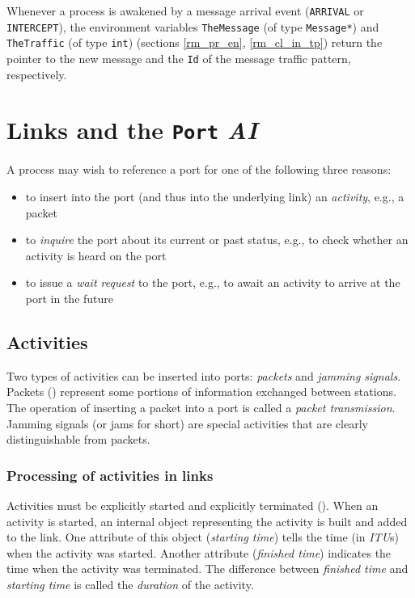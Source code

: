 Whenever a process is
awakened by a message arrival event ({\tt ARRIVAL} or {\tt INTERCEPT}),
the environment variables
{\tt TheMessage} (of type {\tt Message*}) and {\tt TheTraffic}
(of type {\tt int})
(sections \ref{rm_pr_en}, \ref{rm_cl_in_tp})
return the pointer to the new message
and the {\tt Id} of the message traffic pattern, respectively.


\section{Links and the {\tt Port} {\em AI\/}}
\label{rm_po}

A process may wish to reference a port for one of the following three reasons:
\begin{itemize}
\item
to insert into the port (and thus into the underlying link) an {\em activity},
e.g., a packet
\item
to {\em inquire\/} the port about its current or past status, e.g., to
check whether an activity is heard on the port
\item
to issue a {\em wait request\/} to the port, e.g., to await an activity to
arrive at the port in the future
\end{itemize}

\subsection{Activities}
\label{rm_po_ac}

Two types of activities can be inserted into ports:
{\em packets\/} and {\em jamming signals}.
Packets () represent some portions of information exchanged
between stations.
The operation of inserting a packet into a port is called a
{\em packet transmission}.
Jamming signals (or jams for short) are special activities that are
clearly distinguishable from packets.

\subsubsection{Processing of activities in links}
\label{rm_po_ac_pr}

Activities must be explicitly started
and explicitly terminated ().
When an activity is started, an internal object representing the activity
is built and added to the link.
One attribute of this object ({\em starting time\/})
tells the time (in {\em ITU\/}s) when the activity was started.
Another attribute ({\em finished time\/})
indicates the time when the activity was terminated.
The difference between {\em finished time\/} and {\em starting time\/} is
called the {\em duration\/} of the activity.

